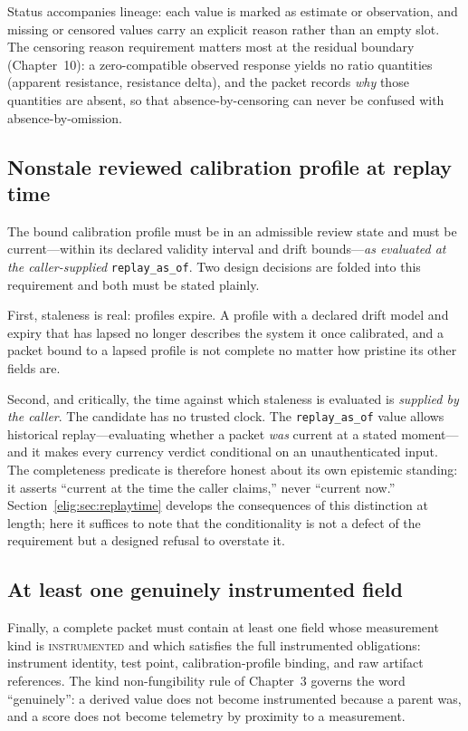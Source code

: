 Status accompanies lineage: each value is marked as estimate or observation, and missing or censored values carry an explicit reason rather than an empty slot. The censoring reason requirement matters most at the residual boundary (Chapter~10): a zero-compatible observed response yields no ratio quantities (apparent resistance, resistance delta), and the packet records \emph{why} those quantities are absent, so that absence-by-censoring can never be confused with absence-by-omission.

\subsection{Nonstale reviewed calibration profile at replay time}\label{elig:sec:nonstale}

The bound calibration profile must be in an admissible review state and must be current---within its declared validity interval and drift bounds---\emph{as evaluated at the caller-supplied} \texttt{replay\_as\_of}. Two design decisions are folded into this requirement and both must be stated plainly.

First, staleness is real: profiles expire. A profile with a declared drift model and expiry that has lapsed no longer describes the system it once calibrated, and a packet bound to a lapsed profile is not complete no matter how pristine its other fields are.

Second, and critically, the time against which staleness is evaluated is \emph{supplied by the caller}. The candidate has no trusted clock. The \texttt{replay\_as\_of} value allows historical replay---evaluating whether a packet \emph{was} current at a stated moment---and it makes every currency verdict conditional on an unauthenticated input. The completeness predicate is therefore honest about its own epistemic standing: it asserts ``current at the time the caller claims,'' never ``current now.'' Section~\ref{elig:sec:replaytime} develops the consequences of this distinction at length; here it suffices to note that the conditionality is not a defect of the requirement but a designed refusal to overstate it.

\subsection{At least one genuinely instrumented field}\label{elig:sec:instrumented}

Finally, a complete packet must contain at least one field whose measurement kind is \textsc{instrumented} and which satisfies the full instrumented obligations: instrument identity, test point, calibration-profile binding, and raw artifact references. The kind non-fungibility rule of Chapter~3 governs the word ``genuinely'': a derived value does not become instrumented because a parent was, and a score does not become telemetry by proximity to a measurement.


